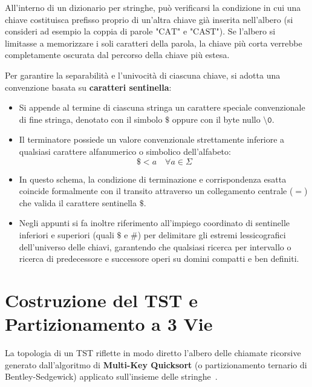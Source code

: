 All'interno di un dizionario per stringhe, pu\`o verificarsi la condizione in cui una chiave costituisca prefisso proprio di un'altra chiave gi\`a inserita nell'albero (si consideri ad esempio la coppia di parole $\text{"CAT"}$ e $\text{"CAST"}$). Se l'albero si limitasse a memorizzare i soli caratteri della parola, la chiave pi\`u corta verrebbe completamente oscurata dal percorso della chiave pi\`u estesa.

Per garantire la separabilit\`a e l'univocit\`a di ciascuna chiave, si adotta una convenzione basata su \textbf{caratteri sentinella}:
\begin{itemize}
  \item Si appende al termine di ciascuna stringa un carattere speciale convenzionale di fine stringa, denotato con il simbolo $\$$ oppure con il byte nullo $\texttt{\textbackslash 0}$.
  \item Il terminatore possiede un valore convenzionale strettamente inferiore a qualsiasi carattere alfanumerico o simbolico dell'alfabeto:
  \begin{equation}
    \$ < a \quad \forall a \in \Sigma
  \end{equation}
  \item In questo schema, la condizione di terminazione e corrispondenza esatta coincide formalmente con il transito attraverso un collegamento centrale ($=$) che valida il carattere sentinella $\$$.
  \item Negli appunti si fa inoltre riferimento all'impiego coordinato di sentinelle inferiori e superiori (quali $\$$ e $\#$) per delimitare gli estremi lessicografici dell'universo delle chiavi, garantendo che qualsiasi ricerca per intervallo o ricerca di predecessore e successore operi su domini compatti e ben definiti.
\end{itemize}

\FloatBarrier
\section{Costruzione del TST e Partizionamento a 3 Vie}
\label{sec:costruzione-tst-partizionamento}

La topologia di un TST riflette in modo diretto l'albero delle chiamate ricorsive generato dall'algoritmo di \textbf{Multi-Key Quicksort} (o partizionamento ternario di Bentley-Sedgewick) applicato sull'insieme delle stringhe~\cite{bentley1997}. 

